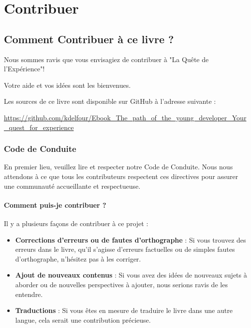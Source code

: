 \part*{Contribuer}
\chapter*{Comment Contribuer à ce livre ?}
\setcounter{tocdepth}{1}
\setcounter{chapter}{0}

Nous sommes ravis que vous envisagiez de contribuer à "La Quête de l'Expérience"! 

Votre aide et vos idées sont les bienvenues.

Les sources de ce livre sont disponible sur GitHub à l'adresse suivante : 

\href{https://github.com/kdelfour/Ebook_The_path_of_the_young_developer_Your_quest_for_experience}{\url{https://github.com/kdelfour/Ebook_The_path_of_the_young_developer_Your_quest_for_experience}}

\section*{Code de Conduite}

En premier lieu, veuillez lire et respecter notre Code de Conduite. Nous nous attendons à ce que tous les contributeurs respectent ces directives pour assurer une communauté accueillante et respectueuse.

\subsection*{Comment puis-je contribuer ?}

Il y a plusieurs façons de contribuer à ce projet :

\begin{itemize}
    \item \textbf{Corrections d'erreurs ou de fautes d'orthographe} :  Si vous trouvez des erreurs dans le livre, qu'il s'agisse d'erreurs factuelles ou de simples fautes d'orthographe, n'hésitez pas à les corriger.
    \item \textbf{Ajout de nouveaux contenus} : Si vous avez des idées de nouveaux sujets à aborder ou de nouvelles perspectives à ajouter, nous serions ravis de les entendre.
    \item \textbf{Traductions} : Si vous êtes en mesure de traduire le livre dans une autre langue, cela serait une contribution précieuse.
\end{itemize}

